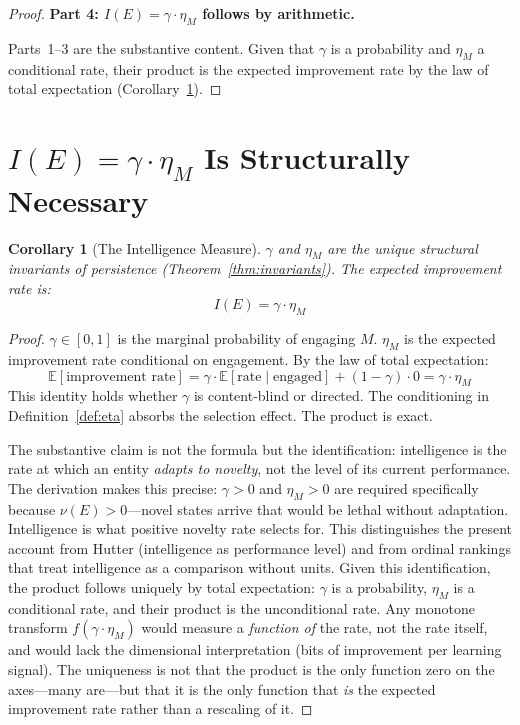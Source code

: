 \documentclass[11pt]{article}
\newtheorem{corollary}[theorem]{Corollary}
\theoremstyle{definition}
\theoremstyle{remark}
\begin{document}
\begin{proof}
\medskip
\textbf{Part 4: $I(E) = \gamma \cdot \eta_M$ follows by arithmetic.}

Parts~1--3 are the substantive content. Given that $\gamma$ is a
probability and $\eta_M$ a conditional rate, their product is the
expected improvement rate by the law of total expectation
(Corollary~\ref{cor:measure}).
\end{proof}

\section{$I(E) = \gamma \cdot \eta_M$ Is Structurally Necessary}
\label{sec:measure}

\begin{corollary}[The Intelligence Measure]
\label{cor:measure}
$\gamma$ and $\eta_M$ are the unique structural invariants of persistence
(Theorem~\ref{thm:invariants}). The expected improvement rate is:
\[
I(E) = \gamma \cdot \eta_M
\]
\end{corollary}

\begin{proof}
$\gamma \in [0, 1]$ is the marginal probability of engaging $M$.
$\eta_M$ is the expected improvement rate conditional on engagement.
By the law of total expectation:
\[
\mathbb{E}[\text{improvement rate}]
= \gamma \cdot \mathbb{E}[\text{rate} \mid \text{engaged}]
+ (1 - \gamma) \cdot 0
= \gamma \cdot \eta_M
\]
This identity holds whether $\gamma$ is content-blind or directed.
The conditioning in Definition~\ref{def:eta} absorbs the selection
effect. The product is exact.

The substantive claim is not the formula but the identification:
intelligence is the rate at which an entity \emph{adapts to novelty},
not the level of its current performance. The derivation makes this
precise: $\gamma > 0$ and $\eta_M > 0$ are required specifically
because $\nu(E) > 0$---novel states arrive that would be lethal
without adaptation. Intelligence is what positive novelty rate
selects for.
This distinguishes the present account from Hutter
\cite{Hutter2005} (intelligence as performance level) and from
ordinal rankings that treat intelligence as a comparison without
units. Given this identification, the product follows uniquely by
total expectation: $\gamma$ is a probability, $\eta_M$ is a
conditional rate, and their product is the unconditional rate.
Any monotone transform $f(\gamma \cdot \eta_M)$ would measure a
\emph{function of} the rate, not the rate itself, and would lack
the dimensional interpretation (bits of improvement per learning
signal). The uniqueness is not that the product is the only
function zero on the axes---many are---but that it is the only
function that \emph{is} the expected improvement rate rather than
a rescaling of it.
\end{proof}
\end{document}
